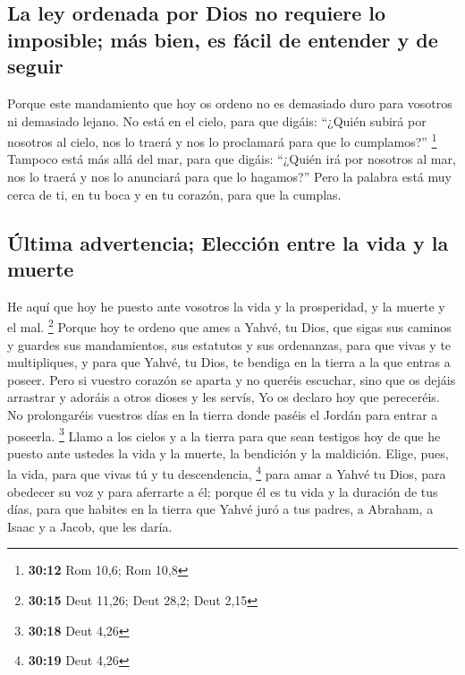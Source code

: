 \begin{paracol}{2}
\hypertarget{la-ley-ordenada-por-dios-no-requiere-lo-imposible-muxe1s-bien-es-fuxe1cil-de-entender-y-de-seguir}{%
\subsection{La ley ordenada por Dios no requiere lo imposible; más bien,
es fácil de entender y de
seguir}\label{la-ley-ordenada-por-dios-no-requiere-lo-imposible-muxe1s-bien-es-fuxe1cil-de-entender-y-de-seguir}}

 Porque este mandamiento que hoy os ordeno no es
demasiado duro para vosotros ni demasiado lejano.  No
está en el cielo, para que digáis: ``¿Quién subirá por nosotros al
cielo, nos lo traerá y nos lo proclamará para que lo cumplamos?''
\footnote{\textbf{30:12} Rom 10,6; Rom 10,8}  Tampoco
está más allá del mar, para que digáis: ``¿Quién irá por nosotros al
mar, nos lo traerá y nos lo anunciará para que lo hagamos?''
 Pero la palabra está muy cerca de ti, en tu boca y en tu
corazón, para que la cumplas.

\hypertarget{uxfaltima-advertencia-elecciuxf3n-entre-la-vida-y-la-muerte}{%
\subsection{Última advertencia; Elección entre la vida y la
muerte}\label{uxfaltima-advertencia-elecciuxf3n-entre-la-vida-y-la-muerte}}

 He aquí que hoy he puesto ante vosotros la vida y la
prosperidad, y la muerte y el mal. \footnote{\textbf{30:15} Deut 11,26;
  Deut 28,2; Deut 2,15}  Porque hoy te ordeno que ames a
Yahvé, tu Dios, que sigas sus caminos y guardes sus mandamientos, sus
estatutos y sus ordenanzas, para que vivas y te multipliques, y para que
Yahvé, tu Dios, te bendiga en la tierra a la que entras a poseer.
 Pero si vuestro corazón se aparta y no queréis escuchar,
sino que os dejáis arrastrar y adoráis a otros dioses y les servís,
 Yo os declaro hoy que pereceréis. No prolongaréis
vuestros días en la tierra donde paséis el Jordán para entrar a
poseerla. \footnote{\textbf{30:18} Deut 4,26}  Llamo a
los cielos y a la tierra para que sean testigos hoy de que he puesto
ante ustedes la vida y la muerte, la bendición y la maldición. Elige,
pues, la vida, para que vivas tú y tu descendencia, \footnote{\textbf{30:19}
  Deut 4,26}  para amar a Yahvé tu Dios, para obedecer su
voz y para aferrarte a él; porque él es tu vida y la duración de tus
días, para que habites en la tierra que Yahvé juró a tus padres, a
Abraham, a Isaac y a Jacob, que les daría.


\end{paracol}
